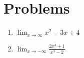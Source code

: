 \documentclass{article}
\begin{document}
\section*{Problems}
\begin{enumerate}
\item $\displaystyle \lim_{x \to \infty} x^2 - 3x + 4$
\item $\displaystyle \lim_{x \to -\infty} \frac{2x^3 + 1}{x^3 - 2}$
\end{enumerate}
\end{document}
